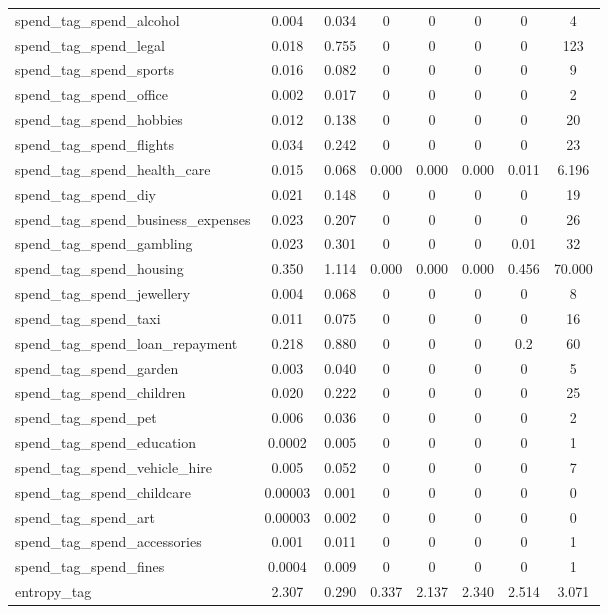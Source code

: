 \begin{table}[!htbp]
\begin{tabular}{@{\extracolsep{5pt}}lccccccc}
spend\_tag\_spend\_alcohol & 0.004 & 0.034 & 0 & 0 & 0 & 0 & 4 \\ 
spend\_tag\_spend\_legal & 0.018 & 0.755 & 0 & 0 & 0 & 0 & 123 \\ 
spend\_tag\_spend\_sports & 0.016 & 0.082 & 0 & 0 & 0 & 0 & 9 \\ 
spend\_tag\_spend\_office & 0.002 & 0.017 & 0 & 0 & 0 & 0 & 2 \\ 
spend\_tag\_spend\_hobbies & 0.012 & 0.138 & 0 & 0 & 0 & 0 & 20 \\ 
spend\_tag\_spend\_flights & 0.034 & 0.242 & 0 & 0 & 0 & 0 & 23 \\ 
spend\_tag\_spend\_health\_care & 0.015 & 0.068 & 0.000 & 0.000 & 0.000 & 0.011 & 6.196 \\ 
spend\_tag\_spend\_diy & 0.021 & 0.148 & 0 & 0 & 0 & 0 & 19 \\ 
spend\_tag\_spend\_business\_expenses & 0.023 & 0.207 & 0 & 0 & 0 & 0 & 26 \\ 
spend\_tag\_spend\_gambling & 0.023 & 0.301 & 0 & 0 & 0 & 0.01 & 32 \\ 
spend\_tag\_spend\_housing & 0.350 & 1.114 & 0.000 & 0.000 & 0.000 & 0.456 & 70.000 \\ 
spend\_tag\_spend\_jewellery & 0.004 & 0.068 & 0 & 0 & 0 & 0 & 8 \\ 
spend\_tag\_spend\_taxi & 0.011 & 0.075 & 0 & 0 & 0 & 0 & 16 \\ 
spend\_tag\_spend\_loan\_repayment & 0.218 & 0.880 & 0 & 0 & 0 & 0.2 & 60 \\ 
spend\_tag\_spend\_garden & 0.003 & 0.040 & 0 & 0 & 0 & 0 & 5 \\ 
spend\_tag\_spend\_children & 0.020 & 0.222 & 0 & 0 & 0 & 0 & 25 \\ 
spend\_tag\_spend\_pet & 0.006 & 0.036 & 0 & 0 & 0 & 0 & 2 \\ 
spend\_tag\_spend\_education & 0.0002 & 0.005 & 0 & 0 & 0 & 0 & 1 \\ 
spend\_tag\_spend\_vehicle\_hire & 0.005 & 0.052 & 0 & 0 & 0 & 0 & 7 \\ 
spend\_tag\_spend\_childcare & 0.00003 & 0.001 & 0 & 0 & 0 & 0 & 0 \\ 
spend\_tag\_spend\_art & 0.00003 & 0.002 & 0 & 0 & 0 & 0 & 0 \\ 
spend\_tag\_spend\_accessories & 0.001 & 0.011 & 0 & 0 & 0 & 0 & 1 \\ 
spend\_tag\_spend\_fines & 0.0004 & 0.009 & 0 & 0 & 0 & 0 & 1 \\ 
entropy\_tag & 2.307 & 0.290 & 0.337 & 2.137 & 2.340 & 2.514 & 3.071 \\ 

\end{tabular}
\end{table}

